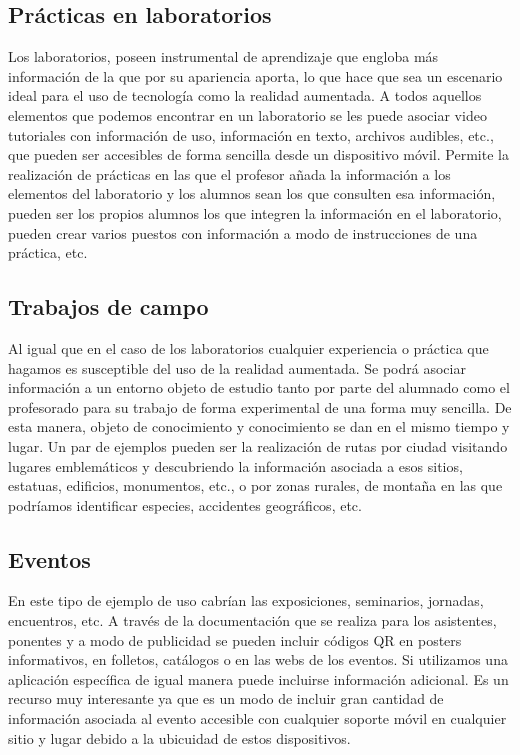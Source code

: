 \subsection{Prácticas en laboratorios} 
Los laboratorios, poseen instrumental de aprendizaje que engloba más información de la que por su apariencia aporta, lo que hace que sea un escenario ideal para el uso de tecnología como la realidad aumentada. A todos aquellos elementos que podemos encontrar en un laboratorio se les puede asociar video tutoriales con información de uso, información en texto, archivos audibles, etc., que pueden ser accesibles de forma sencilla desde un dispositivo móvil. Permite la realización de prácticas en las que el profesor añada la información a los elementos del laboratorio y los alumnos sean los que consulten esa información, pueden ser los propios alumnos los que integren la información en el laboratorio, pueden crear varios puestos con información a modo de instrucciones de una práctica, etc.

\subsection{Trabajos de campo} 
Al igual que en el caso de los laboratorios cualquier experiencia o práctica que hagamos es susceptible del uso de la realidad aumentada. Se podrá asociar información a un entorno objeto de estudio tanto por parte del alumnado como el profesorado para su trabajo de forma experimental de una forma muy sencilla. De esta manera, objeto de conocimiento y conocimiento se dan en el mismo tiempo y lugar. Un par de ejemplos pueden ser la realización de rutas por ciudad visitando lugares emblemáticos y descubriendo la información asociada a esos sitios, estatuas, edificios, monumentos, etc., o por zonas rurales, de montaña en las que podríamos identificar especies, accidentes geográficos, etc.
    
\subsection{Eventos}  
En este tipo de ejemplo de uso cabrían las exposiciones, seminarios, jornadas, encuentros, etc. A través de la documentación que se realiza para los asistentes, ponentes y a modo de publicidad se pueden incluir códigos QR en posters informativos, en folletos, catálogos o en las webs de los eventos. Si utilizamos una aplicación específica de igual manera puede incluirse información adicional. Es un recurso muy interesante ya que es un modo de incluir gran cantidad de información asociada al evento accesible con cualquier soporte móvil en cualquier sitio y lugar debido a la ubicuidad de estos dispositivos.
    
